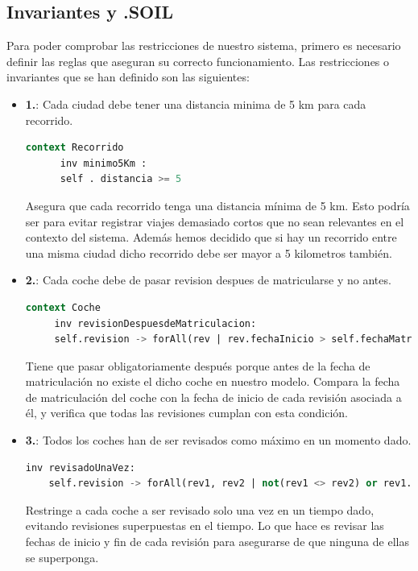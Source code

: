 \documentclass[12pt.a4paper]{article}
\begin{document}
\subsection{Invariantes y .SOIL}
Para poder comprobar las restricciones de nuestro sistema, primero es necesario definir las reglas que aseguran su correcto funcionamiento. Las restricciones o invariantes que se han definido son las siguientes:

\begin{itemize}
    \item \textbf{1.}: Cada ciudad debe tener una distancia minima de 5 km para cada recorrido.
    \begin{lstlisting}[style = useEspecifico,language=SQL]
    context Recorrido
      inv minimo5Km :
      self . distancia >= 5
    \end{lstlisting}
    Asegura que cada recorrido tenga una distancia mínima de 5 km. Esto podría ser para evitar registrar viajes demasiado cortos que no sean relevantes en el contexto del sistema. Además hemos decidido que si hay un recorrido entre una misma ciudad dicho recorrido debe ser mayor a 5 kilometros también.
    
    \item \textbf{2.}: Cada coche debe de pasar revision despues de matricularse y no antes.
    \begin{lstlisting}[style = useEspecifico,language=SQL]
   context Coche
     inv revisionDespuesdeMatriculacion:
     self.revision -> forAll(rev | rev.fechaInicio > self.fechaMatriculacion)
    \end{lstlisting}
    Tiene que pasar obligatoriamente después porque antes de la fecha de matriculación no existe el dicho coche en nuestro modelo.
    Compara la fecha de matriculación del coche con la fecha de inicio de cada revisión asociada a él, y verifica que todas las revisiones cumplan con esta condición. 
    
    \item \textbf{3.}: Todos los coches han de ser revisados como máximo en un momento dado.
    \begin{lstlisting}[style = useEspecifico,language=SQL]
    inv revisadoUnaVez:
    self.revision -> forAll(rev1, rev2 | not(rev1 <> rev2) or rev1.fechaInicio <> rev2.fechaInicio and (rev1.fechaInicio >= rev2.fechaFin or rev2.fechaInicio >= rev1.fechaFin))
    \end{lstlisting}
    Restringe a cada coche a ser revisado solo una vez en un tiempo dado, evitando revisiones superpuestas en el tiempo.
    Lo que hace es revisar las fechas de inicio y fin de cada revisión para asegurarse de que ninguna de ellas se superponga.
    

\end{itemize}
\end{document}
